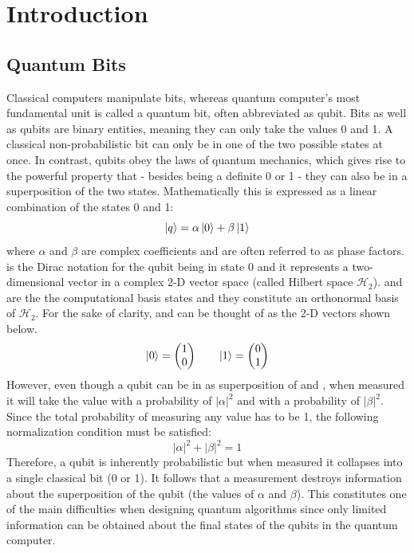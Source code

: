 \chapter{Introduction}\label{sec:introduction}

\section{Quantum Bits}
\label{subsec:qubits}
Classical computers manipulate bits, whereas quantum computer's most fundamental unit is called a quantum bit, often abbreviated as qubit. Bits as well as qubits are binary entities, meaning they can only take the values 0 and 1. A classical non-probabilistic bit can only be in one of the two possible states at once. In contrast, qubits obey the laws of quantum mechanics, which gives rise to the powerful property that - besides being a definite 0 or 1 - they can also be in a superposition of the two states. Mathematically this is expressed as a linear combination of the states 0 and 1:
\begin{equation}
\label{equ: simplequbit}
\ket{q} = \alpha \ket{0} + \beta \ket{1}
\end{equation}
where $\alpha$ and $\beta$ are complex coefficients and are often referred to as phase factors. \0 is the Dirac notation for the qubit being in state 0 and it represents a two-dimensional vector in a complex 2-D vector space (called Hilbert space $\mathcal{H}_{2}$). \0 and \1 are the the computational basis states and they constitute an orthonormal basis of $\mathcal{H}_{2}$. For the sake of clarity, \0 and \1 can be thought of as the 2-D vectors shown below.
\begin{equation}
\label{equ: 0and1kets}
\ket{0} =  \begin{pmatrix}1\\0\end{pmatrix} \quad \quad \ket{1} = \begin{pmatrix}0\\1\end{pmatrix}
\end{equation}
However, even though a qubit can be in as superposition of \0 and \1, when measured it will take the value \0 with a probability of ${|\alpha|}^{2}$ and \1 with a probability of ${|\beta|}^{2}$. Since the total probability of measuring any value has to be 1, the following normalization condition must be satisfied:
\begin{equation}
\label{equ: normalization}
{|\alpha|}^{2} + {|\beta|}^{2} =  1
\end{equation}
Therefore, a qubit is inherently probabilistic but when measured it collapses into a single classical bit (0 or 1). It follows that a measurement destroys information about the superposition of the qubit (the values of $\alpha$ and $\beta$). This constitutes one of the main difficulties when designing quantum algorithms since only limited information can be obtained about the final states of the qubits in the quantum computer.

